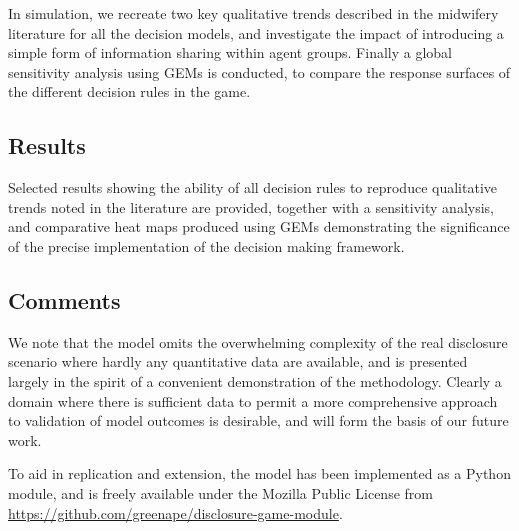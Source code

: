 In simulation, we recreate two key qualitative trends described in the midwifery literature for all the decision models, and investigate the impact of introducing a simple form of information sharing within agent groups.
Finally a global sensitivity analysis using \acp{GEM} is conducted, to compare the response surfaces of the different decision rules in the game.

\subsection*{Results} 

Selected results showing the ability of all decision rules to reproduce qualitative trends noted in the literature are provided, together with a sensitivity analysis, and comparative heat maps produced using \acp{GEM} demonstrating the significance of the precise implementation of the decision making framework.

\subsection*{Comments} 


We note that the model omits the overwhelming complexity of the real disclosure scenario where hardly any quantitative data are available, and is presented largely in the spirit of a convenient demonstration of the methodology. Clearly a domain where there is sufficient data to permit a more comprehensive approach to validation of model outcomes is desirable, and will form the basis of our future work.

To aid in replication and extension, the model has been implemented as a Python module, and is freely available under the Mozilla Public License from \url{https://github.com/greenape/disclosure-game-module}.